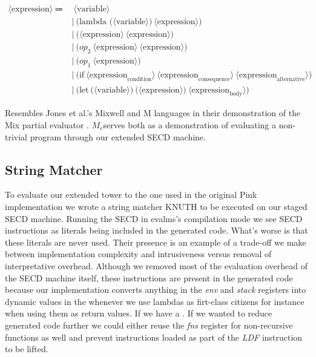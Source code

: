 \documentclass[fleqn]{article}
\theoremstyle{definition}
\newcommand{\mevl}{$M_{e}$}
\begin{document}
\begin{align*}
	\langle \text{expression} \rangle \Coloneqq & \: \langle \text{variable} \rangle \\
															   & | \: \text{(lambda (} \langle \text{variable} \rangle\text{)} \: \langle \text{expression} \rangle\text{)} \\
															   & | \: \text{(} \langle \text{expression} \rangle \: \langle \text{expression} \rangle \text{)} \\
															   & | \: \text{(} op_{2} \: \langle \text{expression} \rangle \: \langle \text{expression} \rangle \text{)} \\
															   & | \: \text{(} op_{1} \: \langle \text{expression} \rangle \text{)} \\
															   & | \: \text{(if} \: \langle \text{expression}_\text{condition} \rangle \: \langle \text{expression}_\text{consequence} \rangle \: \langle \text{expression}_\text{alternative} \rangle \text{)} \\
															   & | \: \text{(let} \: \text{(} \langle \text{variable} \rangle \text{)} \: \text{(}\langle \text{expression} \rangle \text{)} \: \langle \text{expression}_\text{body} \rangle \text{)}
\end{align*}


Resembles Jones et al.'s Mixwell and M languages in their demonstration of the Mix partial evaluator \cite{jones1989mix}. \mevl serves both as a demonstration of evaluating a non-trivial program through our extended SECD machine. 


\subsection{String Matcher}
To evaluate our extended tower to the one used in the original Pink implementation we wrote a string matcher KNUTH to be executed on our staged SECD machine. Running the SECD in evalms's compilation mode we see SECD instructions as literals being included in the generated code. What's worse is that these literals are never used. Their presence is an example of a trade-off we make between implementation complexity and intrusiveness versus removal of interpretative overhead. Although we removed most of the evaluation overhead of the SECD machine itself, these instructions are present in the generated code because our implementation converts anything in the \textit{env} and \textit{stack} registers into dynamic values in the whenever we use lambdas as firt-class citizens for instance when using them as return values. If we have a . If we wanted to reduce generated code further we could either reuse the \textit{fns} register for non-recursive functions as well and prevent instructions loaded as part of the \textit{LDF} instruction to be lifted.
\end{document}
